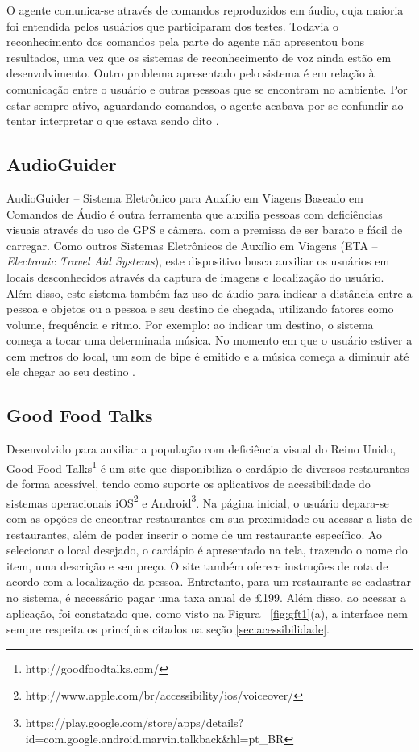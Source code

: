 O agente comunica-se através de comandos reproduzidos em áudio, cuja maioria foi entendida pelos usuários que participaram dos testes. Todavia o reconhecimento dos comandos pela parte do agente não apresentou bons resultados, uma vez que os sistemas de reconhecimento de voz ainda estão em desenvolvimento. Outro problema apresentado pelo sistema é em relação à comunicação entre o usuário e outras pessoas que se encontram no ambiente. Por estar sempre ativo, aguardando comandos, o agente acabava por se confundir ao tentar interpretar o que estava sendo dito \cite{KULYUKIN2002}. 

\subsection{AudioGuider}
AudioGuider -- Sistema Eletrônico para Auxílio em Viagens Baseado em Comandos de Áudio é outra ferramenta que auxilia pessoas com deficiências visuais através do uso de GPS e câmera, com a premissa de ser barato e fácil de carregar. Como outros Sistemas Eletrônicos de Auxílio em Viagens (ETA -- \emph{Electronic Travel Aid Systems}), este dispositivo busca auxiliar os usuários em locais desconhecidos através da captura de imagens e localização do usuário. Além disso, este sistema também faz uso de áudio para indicar a distância entre a pessoa e objetos ou a pessoa e seu destino de chegada, utilizando fatores como volume, frequência e ritmo. Por exemplo: ao indicar um destino, o sistema começa a tocar uma determinada música. No momento em que o usuário estiver a cem metros do local, um som de bipe é emitido e a música começa a diminuir até ele chegar ao seu destino \cite{ZHIGANG2010}.

\subsection{Good Food Talks}
Desenvolvido para auxiliar a população com deficiência visual do Reino Unido, Good Food Talks\footnote{http://goodfoodtalks.com/} é um site que disponibiliza o cardápio de diversos restaurantes de forma acessível, tendo como suporte os aplicativos de acessibilidade do sistemas operacionais iOS\footnote{http://www.apple.com/br/accessibility/ios/voiceover/} e Android\footnote{https://play.google.com/store/apps/details?id=com.google.android.marvin.talkback\&hl=pt\_BR}. Na página inicial, o usuário depara-se com as opções de encontrar restaurantes em sua proximidade ou acessar a lista de restaurantes, além de poder inserir o nome de um restaurante específico. Ao selecionar o local desejado, o cardápio é apresentado na tela, trazendo o nome do item, uma descrição e seu preço. O site também oferece instruções de rota de acordo com a localização da pessoa. Entretanto, para um restaurante se cadastrar no sistema, é necessário pagar uma taxa anual de £199. Além disso, ao acessar a aplicação, foi constatado que, como visto na Figura ~\ref{fig:gft1}(a), a interface nem sempre respeita os princípios citados na seção \ref{sec:acessibilidade}.

